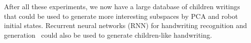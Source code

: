 \documentclass[conference]{IEEEtran}
\begin{document}
After all these
experiments, we now have a large database of children writings that could be
used to generate more interesting subspaces by PCA and robot initial states. 
Recurrent neural networks (RNN) for handwriting recognition and generation~\cite{DBLP:journals/corr/Graves13} could also be used to generate 
children-like handwriting.




 
\end{document}
